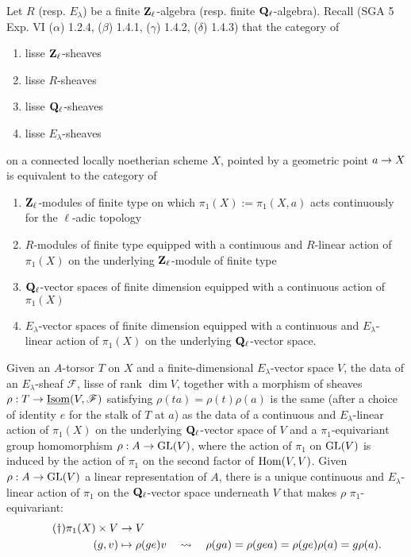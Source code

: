 \documentclass[deligne.tex]{subfiles}
\begin{document}
Let $R$ (resp. $E_\lambda$) be a finite $\mathbf{Z}_\ell$-algebra
(resp. finite $\mathbf{Q}_\ell$-algebra).
Recall (SGA 5 Exp. VI ($\alpha$) 1.2.4, ($\beta$) 1.4.1, ($\gamma$) 1.4.2, ($\delta$) 1.4.3) that the category of
\begin{enumerate}[label=(\greek*)]
	\item lisse $\mathbf{Z}_\ell$-sheaves
	\item lisse $R$-sheaves
	\item lisse $\mathbf{Q}_\ell$-sheaves
	\item lisse $E_\lambda$-sheaves
\end{enumerate}
on a connected locally noetherian scheme $X$, pointed by a geometric point
$a\rightarrow X$ is equivalent to the category of
\begin{enumerate}[label=(\greek*)]
	\item $\mathbf{Z}_\ell$-modules of finite type on which $\pi_1(X):=\pi_1(X,a)$ acts continuously for the $\ell$-adic topology
	\item $R$-modules of finite type equipped with a continuous and $R$-linear action of $\pi_1(X)$ on the underlying $\mathbf{Z}_\ell$-module of finite type
	\item $\mathbf{Q}_\ell$-vector spaces of finite dimension equipped with a continuous action of $\pi_1(X)$
	\item $E_\lambda$-vector spaces of finite dimension equipped with a continuous and $E_\lambda$-linear action of $\pi_1(X)$ on the underlying $\mathbf{Q}_\ell$-vector space.
\end{enumerate}
Given an $A$-torsor $T$ on $X$ and a finite-dimensional $E_\lambda$-vector
space $V$, the data of an 
$E_\lambda$-sheaf $\mathscr F$, lisse of rank $\dim V$, together with a
morphism of sheaves $\rho:T\rightarrow\underline{\operatorname{Isom}}(V,\mathscr F)$
satisfying $\rho(ta)=\rho(t)\rho(a)$ is the same (after a choice of identity
$e$ for the stalk of $T$ at $a$) as the data of a continuous
and $E_\lambda$-linear action of $\pi_1(X)$ on the underlying
$\mathbf{Q}_\ell$-vector space of $V$ and a $\pi_1$-equivariant group homomorphism
$\rho:A\rightarrow\operatorname{GL}(V)$, where the action of $\pi_1$ on $\operatorname{GL}(V)$ is induced by the
action of $\pi_1$ on the second factor of $\operatorname{Hom}(V,V)$.
Given $\rho:A\rightarrow\operatorname{GL}(V)$ a linear representation of $A$, there is a unique
continuous and $E_\lambda$-linear action of $\pi_1$ on the $\mathbf{Q}_\ell$-vector
space underneath $V$ that makes $\rho$ $\pi_1$-equivariant:
\begin{align*}\tag{$\dagger$}
	\pi_1(X)\times V&\rightarrow V \\
	(g,v)&\mapsto \rho(ge)v
\quad\rightsquigarrow\quad\rho(ga)=\rho(gea)=\rho(ge)\rho(a)=g\rho(a).
\end{align*}
\end{document}
